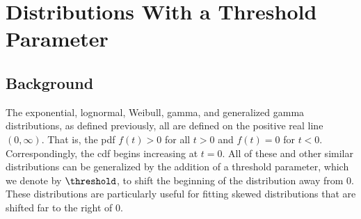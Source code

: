 \section{Distributions With a Threshold Parameter} 
\subsection{Background}
\label{section:intro.to.threshold.distributions}
The exponential, lognormal, Weibull, gamma, and generalized gamma
distributions, as defined previously, all are defined on the
positive real line $(0,\infty)$. That is, the pdf $f(t) > 0$ for all
$t>0$ and $f(t)=0$ for $t < 0$.  Correspondingly, the cdf begins
increasing at $t=0$.  All of these and other similar distributions
can be generalized by the addition of a threshold parameter,
which we denote by $\threshold$, to shift the beginning of the
distribution away from 0. These distributions are particularly
useful for fitting skewed distributions that are shifted far to the
right of 0.
